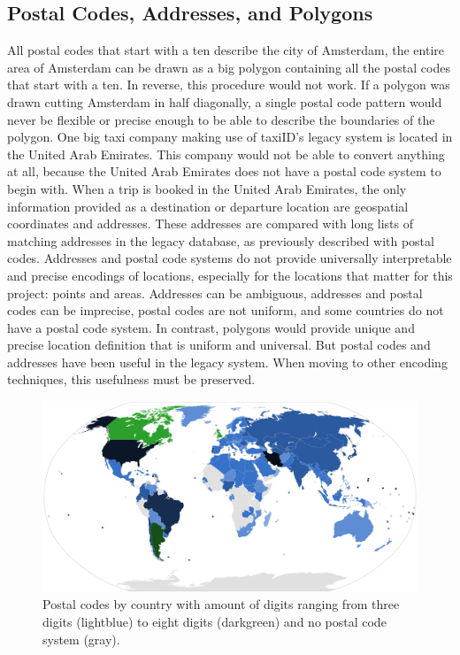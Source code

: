 \subsection{Postal Codes, Addresses, and Polygons}
All postal codes that start with a ten describe the city of Amsterdam, the entire area of Amsterdam can be drawn as a big polygon containing all the postal codes that start with a ten. In reverse, this procedure would not work. If a polygon was drawn cutting Amsterdam in half diagonally, a single postal code pattern would never be flexible or precise enough to be able to describe the boundaries of the polygon. One big taxi company making use of taxiID's legacy system is located in the United Arab Emirates. This company would not be able to convert anything at all, because the United Arab Emirates does not have a postal code system to begin with. When a trip is booked in the United Arab Emirates, the only information provided as a destination or departure location are geospatial coordinates and addresses. These addresses are compared with long lists of matching addresses in the legacy database, as previously described with postal codes. Addresses and postal code systems do not provide universally interpretable and precise encodings of locations, especially for the locations that matter for this project: points and areas. Addresses can be ambiguous, addresses and postal codes can be imprecise, postal codes are not uniform, and some countries do not have a postal code system. In contrast, polygons would provide unique and precise location definition that is uniform and universal. But postal codes and addresses have been useful in the legacy system. When moving to other encoding techniques, this usefulness must be preserved.

\begin{figure}[htbp!]
	\centering
	\includegraphics[width=1\textwidth]{PostalCodes}
	\caption[PostalCodes]{Postal codes by country with amount of digits ranging from three digits (lightblue) to eight digits (darkgreen) and no postal code system (gray).}
	\label{fig:postalcodes}
\end{figure}

